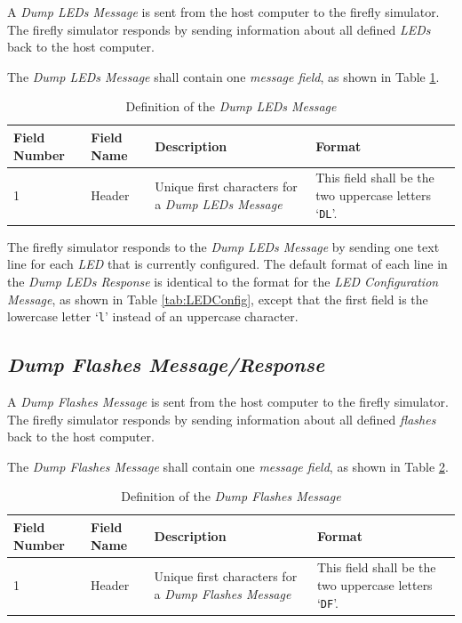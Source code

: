 \documentclass[letterpaper,11pt]{article}
\begin{document}
A \textit{Dump LEDs Message} is sent from the host computer to the
firefly simulator. The firefly simulator responds by sending information
about all defined \textit{LEDs} back to the host computer.

The \textit{Dump LEDs Message} shall contain one \textit{message field},
as shown in Table \ref{tab:DumpLEDs}.

\begin{table}[H]
  \caption{Definition of the \textit{Dump LEDs Message}}
  \centering
  \setlength\extrarowheight{2pt}
  \begin{tabular}[h]{|p{0.5in}|p{1.00in}|p{2.25in}|p{2.25in}|} \hline
    Field Number & Field Name & Description & Format \\ \hline
    1            & Header
    & Unique first characters for a \textit{Dump LEDs Message}
    & This field shall be the two uppercase letters `\texttt{DL}'.
    \\ \hline
  \end{tabular}
  \label{tab:DumpLEDs}
\end{table}

The firefly simulator responds to the \textit{Dump LEDs Message} by
sending one text line for each \textit{LED} that is currently configured.
The default format of each line in the \textit{Dump LEDs Response} is identical
to the format for the \textit{LED Configuration Message}, as shown in
Table \ref{tab:LEDConfig}, except that the first field is the lowercase letter
`\texttt{l}' instead of an uppercase character.

\subsection{\textit{Dump Flashes Message/Response}}

A \textit{Dump Flashes Message} is sent from the host computer to the
firefly simulator. The firefly simulator responds by sending information
about all defined \textit{flashes} back to the host computer.

The \textit{Dump Flashes Message} shall contain one \textit{message field},
as shown in Table \ref{tab:DumpFlashes}.

\begin{table}[H]
  \caption{Definition of the \textit{Dump Flashes Message}}
  \centering
  \setlength\extrarowheight{2pt}
  \begin{tabular}[h]{|p{0.5in}|p{1.00in}|p{2.25in}|p{2.25in}|} \hline
    Field Number & Field Name & Description & Format \\ \hline
    1            & Header
    & Unique first characters for a \textit{Dump Flashes Message}
    & This field shall be the two uppercase letters `\texttt{DF}'.
    \\ \hline
  \end{tabular}
  \label{tab:DumpFlashes}
\end{table}
\end{document}
